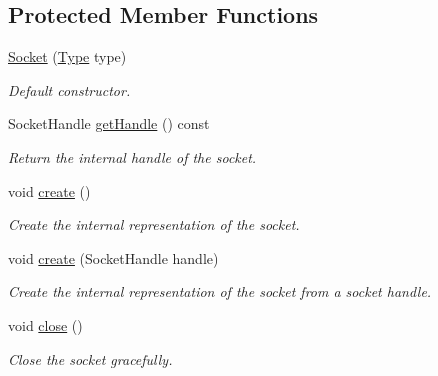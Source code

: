 \subsection*{Protected Member Functions}
\begin{DoxyCompactItemize}
\item 
\mbox{\hyperlink{classsf_1_1_socket_a80ffb47ec0bafc83af019055d3e6a303}{Socket}} (\mbox{\hyperlink{classsf_1_1_socket_a5d3ff44e56e68f02816bb0fabc34adf8}{Type}} type)
\begin{DoxyCompactList}\small\item\em Default constructor. \end{DoxyCompactList}\item 
Socket\+Handle \mbox{\hyperlink{classsf_1_1_socket_a675457784284ae2f5640bbbe16729393}{get\+Handle}} () const
\begin{DoxyCompactList}\small\item\em Return the internal handle of the socket. \end{DoxyCompactList}\item 
void \mbox{\hyperlink{classsf_1_1_socket_aafbe140f4b1921e0d19e88cf7a61dcbc}{create}} ()
\begin{DoxyCompactList}\small\item\em Create the internal representation of the socket. \end{DoxyCompactList}\item 
void \mbox{\hyperlink{classsf_1_1_socket_af1dd898f7aa3ead7ff7b2d1c20e97781}{create}} (Socket\+Handle handle)
\begin{DoxyCompactList}\small\item\em Create the internal representation of the socket from a socket handle. \end{DoxyCompactList}\item 
void \mbox{\hyperlink{classsf_1_1_socket_a71f2f5c2aa99e01cafe824fee4c573be}{close}} ()
\begin{DoxyCompactList}\small\item\em Close the socket gracefully. \end{DoxyCompactList}\end{DoxyCompactItemize}
